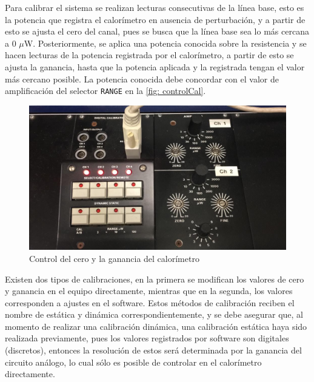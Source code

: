 	Para calibrar el sistema se realizan lecturas consecutivas de la línea base, esto es la potencia que registra el calorímetro en ausencia de perturbación, y a partir de esto se ajusta el cero del canal, pues se busca que la línea base sea lo más cercana a 0 $\mu$W. Posteriormente, se aplica una potencia conocida sobre la resistencia y se hacen lecturas de la potencia registrada por el calorímetro, a partir de esto se ajusta la ganancia, hasta que la potencia aplicada y la registrada tengan el valor más cercano posible. La potencia conocida debe concordar con el valor de amplificación del selector \texttt{RANGE} en la \autoref{fig: controlCal}.
	\begin{figure}[h]
		\centering
		\includegraphics[width=0.7\linewidth]{Figures/controlCal}
		\caption{Control del cero y la ganancia del calor\'imetro}
		\label{fig: controlCal}
	\end{figure}
	
	Existen dos tipos de calibraciones, en la primera se modifican los valores de cero y ganancia en el equipo directamente, mientras que en la segunda, los valores corresponden a ajustes en el software. Estos métodos de calibración reciben el nombre de estática y dinámica correspondientemente, y se debe asegurar que, al momento de realizar una calibración dinámica, una calibración estática haya sido realizada previamente, pues los valores registrados por software son digitales (discretos), entonces la resolución de estos será determinada por la ganancia del circuito análogo, lo cual sólo es posible de controlar en el calorímetro directamente.
	 

